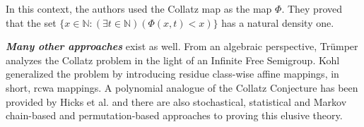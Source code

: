 In this context, the authors used the Collatz map as the map $\Phi$. They proved that the set $\{x\in\mathbb{N}:(\exists t\in\mathbb{N})(\Phi(x,t)<x)\}$ has a natural density one.

\par\medskip
\textit{\textbf{Many other approaches}} exist as well. From an algebraic perspective, Trümper \cite{Ref_Truemper_2014} analyzes the Collatz problem in the light of an Infinite Free Semigroup. Kohl \cite{Ref_Kohl_2008} generalized the problem by introducing residue class-wise affine mappings, in short, rcwa mappings. A polynomial analogue of the Collatz Conjecture has been provided by Hicks et al. \cite{Ref_Hicks_Mullen_Yucas_Zavislak_2008} \cite{Ref_Snapp_Tracy_2008} and there are also stochastical, statistical and Markov chain-based and permutation-based approaches to proving this elusive theory.
